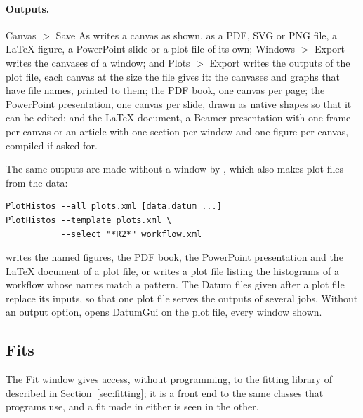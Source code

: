 \paragraph{Outputs.}
Canvas $>$ Save As writes a canvas as shown, as a PDF, SVG or PNG file, a \LaTeX{} figure, a PowerPoint slide or a plot
file of its own; Windows $>$ Export writes the canvases of a window; and Plots $>$ Export writes the outputs of the plot
file, each canvas at the size the file gives it: the canvases and graphs that have file names, printed to them; the
PDF book, one canvas per page; the PowerPoint presentation, one canvas per slide, drawn as native shapes so that it
can be edited; and the \LaTeX{} document, a Beamer presentation with one frame per canvas or an article with one
section per window and one figure per canvas, compiled if asked for.

\label{sec:plotbatch}
The same outputs are made without a window by , which also makes plot files from the data:
{\footnotesize
\begin{verbatim}
PlotHistos --all plots.xml [data.datum ...]
PlotHistos --template plots.xml \
           --select "*R2*" workflow.xml
\end{verbatim}}
\noindent writes the named figures, the PDF book, the PowerPoint presentation and the \LaTeX{} document of a plot file,
or writes a plot file listing the histograms of a workflow whose names match a pattern.
\noindent The Datum files given after a plot file replace its inputs, so that one plot file serves the outputs of
several jobs. Without an output option, \code{PlotHistos} opens DatumGui on the plot file, every window shown.

\subsection{Fits}
\label{sec:guifits}

The Fit window gives access, without programming, to the fitting library of \Datum{} described in
Section~\ref{sec:fitting}; it is a front end to the same classes that programs use, and a fit made in either is
seen in the other.

